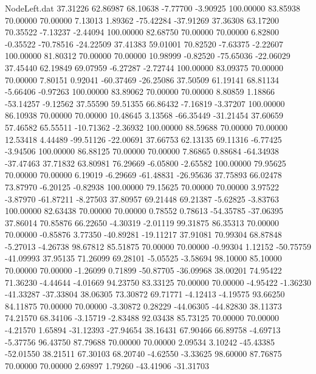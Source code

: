 \begin{filecontents}{NodeLeft.dat}
  37.31226   62.86987   68.10638    -7.77700   -3.90925  100.00000   83.85938   70.00000   70.00000    7.13013    1.89362  -75.42284  -37.91269
  37.36308   63.17200   70.35522    -7.13237   -2.44094  100.00000   82.68750   70.00000   70.00000    6.82800   -0.35522  -70.78516  -24.22509
  37.41383   59.01001   70.82520    -7.63375   -2.22607  100.00000   81.80312   70.00000   70.00000   10.98999   -0.82520  -75.65036  -22.06029
  37.45440   62.19849   69.07959    -6.27287   -2.72744  100.00000   83.09375   70.00000   70.00000    7.80151    0.92041  -60.37469  -26.25086
  37.50509   61.19141   68.81134    -5.66406   -0.97263  100.00000   83.89062   70.00000   70.00000    8.80859    1.18866  -53.14257   -9.12562
  37.55590   59.51355   66.86432    -7.16819   -3.37207  100.00000   86.10938   70.00000   70.00000   10.48645    3.13568  -66.35449  -31.21454
  37.60659   57.46582   65.55511   -10.71362   -2.36932  100.00000   88.59688   70.00000   70.00000   12.53418    4.44489  -99.51126  -22.00691
  37.66753   62.13135   69.11316    -6.77425   -3.94506  100.00000   86.88125   70.00000   70.00000    7.86865    0.88684  -64.34938  -37.47463
  37.71832   63.80981   76.29669    -6.05800   -2.65582  100.00000   79.95625   70.00000   70.00000    6.19019   -6.29669  -61.48831  -26.95636
  37.75893   66.02478   73.87970    -6.20125   -0.82938  100.00000   79.15625   70.00000   70.00000    3.97522   -3.87970  -61.87211   -8.27503
  37.80957   69.21448   69.21387    -5.62825   -3.83763  100.00000   82.63438   70.00000   70.00000    0.78552    0.78613  -54.35785  -37.06395
  37.86014   70.85876   66.22650    -4.30319   -2.01119   99.31875   86.35313   70.00000   70.00000   -0.85876    3.77350  -40.89281  -19.11217
  37.91081   70.99304   68.87848    -5.27013   -4.26738   98.67812   85.51875   70.00000   70.00000   -0.99304    1.12152  -50.75759  -41.09993
  37.95135   71.26099   69.28101    -5.05525   -3.58694   98.10000   85.10000   70.00000   70.00000   -1.26099    0.71899  -50.87705  -36.09968
  38.00201   74.95422   71.36230    -4.44644   -4.01669   94.23750   83.33125   70.00000   70.00000   -4.95422   -1.36230  -41.33287  -37.33804
  38.06305   73.30872   69.71771    -4.12413   -4.19575   93.66250   84.11875   70.00000   70.00000   -3.30872    0.28229  -44.06305  -44.82830
  38.11373   74.21570   68.34106    -3.15719   -2.83488   92.03438   85.73125   70.00000   70.00000   -4.21570    1.65894  -31.12393  -27.94654
  38.16431   67.90466   66.89758    -4.69713   -5.37756   96.43750   87.79688   70.00000   70.00000    2.09534    3.10242  -45.43385  -52.01550
  38.21511   67.30103   68.20740    -4.62550   -3.33625   98.60000   87.76875   70.00000   70.00000    2.69897    1.79260  -43.41906  -31.31703

\end{filecontents}
